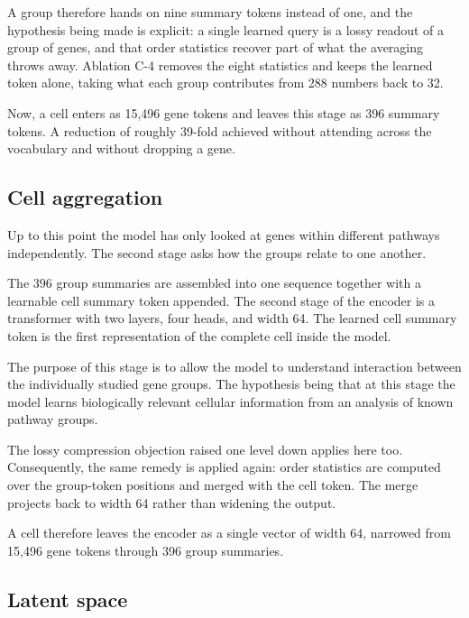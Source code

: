 A group therefore hands on nine summary tokens instead of one, and the
hypothesis being made is explicit: a single learned query is a lossy
readout of a group of genes, and that order statistics recover part of
what the averaging throws away. Ablation C-4 removes the eight statistics
and keeps the learned token alone, taking what each group contributes from
288 numbers back to 32.

Now, a cell enters as 15{,}496 gene tokens and leaves this stage as 396 
summary tokens. A reduction of roughly 39-fold achieved without attending 
across the vocabulary and without dropping a gene.


\subsection*{Cell aggregation}

Up to this point the model has only looked at genes within different 
pathways independently. The second stage asks how the groups relate to one 
another.

The 396 group summaries are assembled into one sequence together with a
learnable cell summary token appended. The second stage of the encoder 
is a transformer with two layers, four heads, and width 64. The learned 
cell summary token is the first representation of the complete cell 
inside the model.

The purpose of this stage is to allow the model to understand interaction 
between the individually studied gene groups. The hypothesis being that 
at this stage the model learns biologically relevant cellular information 
from an analysis of known pathway groups.

The lossy compression objection raised one level down applies here too. 
Consequently, the same remedy is applied again: order statistics are 
computed over the group-token positions and merged with the cell token. 
The merge projects back to width 64 rather than widening the output.

A cell therefore leaves the encoder as a single vector of width 64,
narrowed from 15{,}496 gene tokens through 396 group summaries.


\subsection*{Latent space}

